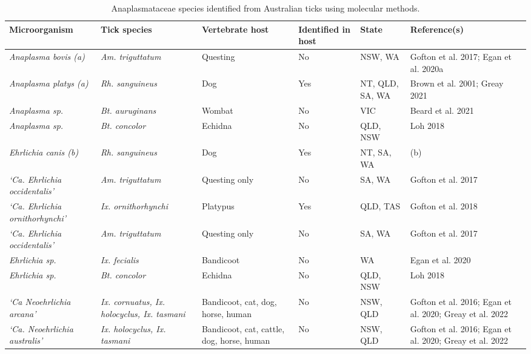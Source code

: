 \documentclass[a4paper, nobind]{templates/ociamthesis}
\begin{document}
\begin{table}

\caption[Anaplasmataceae species identified from Australian ticks.]{\label{tab:T1anaplasm}Anaplasmataceae species identified from Australian ticks using molecular methods.}
\centering
\fontsize{8}{10}\selectfont
\begin{threeparttable}
\begin{tabular}[t]{>{\raggedright\arraybackslash}p{10em}>{\raggedright\arraybackslash}p{10em}>{\raggedright\arraybackslash}p{10em}>{\raggedright\arraybackslash}p{6em}>{\raggedright\arraybackslash}p{6em}>{\raggedright\arraybackslash}p{6em}}
\toprule
Microorganism & Tick species & Vertebrate host & Identified in host & State & Reference(s)\\
\midrule
\em{Anaplasma bovis (a)} & \em{Am. triguttatum} & Questing & No & NSW, WA & Gofton et al. 2017; Egan et al. 2020a\\
\em{Anaplasma platys (a)} & \em{Rh. sanguineus} & Dog & Yes & NT, QLD, SA, WA & Brown et al. 2001; Greay 2021\\
\em{Anaplasma sp.} & \em{Bt. auruginans} & Wombat & No & VIC & Beard et al. 2021\\
\em{Anaplasma sp.} & \em{Bt. concolor} & Echidna & No & QLD, NSW & Loh 2018\\
\em{Ehrlichia canis (b)} & \em{Rh. sanguineus} & Dog & Yes & NT, SA, WA & (b)\\
\em{‘Ca. Ehrlichia occidentalis’} & \em{Am. triguttatum} & Questing only & No & SA, WA & Gofton et al. \vphantom{1} 2017\\
\em{‘Ca. Ehrlichia ornithorhynchi’} & \em{Ix. ornithorhynchi} & Platypus & Yes & QLD, TAS & Gofton et al. 2018\\
\em{‘Ca. Ehrlichia occidentalis’} & \em{Am. triguttatum} & Questing only & No & SA, WA & Gofton et al. 2017\\
\em{Ehrlichia sp.} & \em{Ix. fecialis} & Bandicoot & No & WA & Egan et al. 2020\\
\em{Ehrlichia sp.} & \em{Bt. concolor} & Echidna & No & QLD, NSW & Loh 2018\\
\em{‘Ca Neoehrlichia arcana’} & \em{Ix. cornuatus, Ix. holocyclus, Ix. tasmani} & Bandicoot, cat, dog, horse, human & No & NSW, QLD & Gofton et al. 2016; Egan et al. 2020; Greay et al. 2022\\
\em{‘Ca. Neoehrlichia australis’} & \em{Ix. holocyclus, Ix. tasmani} & Bandicoot, cat, cattle, dog, horse, human & No & NSW, QLD & Gofton et al. 2016; Egan et al. 2020; Greay et al. 2022\\

\end{tabular}
\end{threeparttable}
\end{table}
\end{document}
